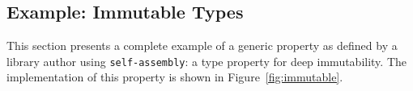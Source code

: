 \documentclass[preprint,nocopyrightspace]{sigplanconf}
\begin{document}











\subsection{Example: Immutable Types}\label{sec:genprop-example}



This section presents a complete example of a generic property as defined by a
library author using \texttt{self-assembly}: a type property for deep immutability. The
implementation of this property is shown in Figure~\ref{fig:immutable}.
\end{document}
